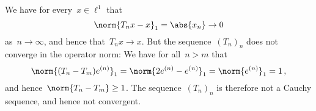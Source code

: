We have for every~$x \in \ell^1$ that
\[
      \norm{T_n x - x}_1
  =   \abs{x_n}
  \to 0
\]
as~$n \to \infty$, and hence that~$T_n x \to x$.
But the sequence~$(T_n)_n$ does not converge in the operator norm:
We have for all~$n > m$ that
\[
    \norm{ (T_n - T_m) e^{(n)} }_1
  = \norm{ 2 e^{(n)} - e^{(n)} }_1
  = \norm{ e^{(n)} }_1
  = 1 \,,
\]
and hence~$\norm{ T_n - T_m } \geq 1$.
The sequence~$(T_n)_n$ is therefore not a Cauchy sequence, and hence not convergent.
